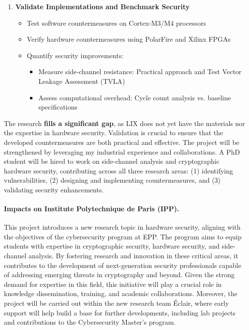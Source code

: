 \documentclass[11pt, a4paper]{article}
\begin{document}
\begin{enumerate}
\item \textbf{Validate Implementations and Benchmark Security}
\begin{itemize}[leftmargin=2em]
    \item Test software countermeasures on Cortex-M3/M4 processors
    \item Verify hardware countermeasures using PolarFire and Xilinx FPGAs
    \item Quantify security improvements:
    \begin{itemize}
        \item Measure side-channel resistance: Practical approach and Test Vector Leakage Assessment (TVLA)
        \item Assess computational overhead: Cycle count analysis vs. baseline specifications
    \end{itemize}
\end{itemize}
\end{enumerate}
The research \textbf{fills a significant gap}, as LIX does not yet have 
the materials nor the expertise in hardware security. 
Validation is crucial to ensure that the developed countermeasures 
are both practical and effective. The project will be strengthened by 
leveraging my industrial experience and collaborations. 
A PhD student will be hired to work on side-channel analysis and 
cryptographic hardware security, contributing across all three 
research areas: (1) identifying vulnerabilities, (2) designing and 
implementing countermeasures, and (3) validating security 
enhancements.

\vspace{-0.5cm}


\paragraph{Impacts on Institute Polytechnique de Paris (IPP).}
This project introduces a new research topic in hardware security, 
aligning with the objectives of the cybersecurity program at 
EPP. 
The program aims to equip students with expertise in 
cryptographic security, hardware security, and side-channel analysis. 
By fostering research and innovation in these critical areas, 
it contributes to the development of next-generation security 
professionals capable of addressing emerging threats in 
cryptography and beyond. Given the strong demand for expertise 
in this field, this initiative will play a crucial role in knowledge 
dissemination, training, and academic collaborations. Moreover, the 
project will be carried out within the new research team \'Eclair, 
where early support will help build a base for further developments, 
including lab projects and contributions to the Cybersecurity 
Master's program.
\end{document}
